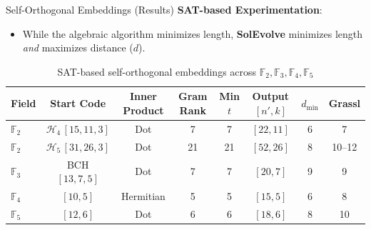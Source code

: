 \documentclass[10pt, aspectratio=169]{beamer}
\begin{document}
\begin{frame}{Self-Orthogonal Embeddings (Results)}
    \textbf{SAT-based Experimentation}:
    \begin{itemize}
        \item While the algebraic algorithm minimizes length, \textbf{SolEvolve} minimizes length \textit{and} maximizes distance ($d$).
    \end{itemize}

    \begin{table}[htbp]
    \centering \tiny
    \caption{SAT-based self-orthogonal embeddings across $\mathbb{F}_2,\mathbb{F}_3,\mathbb{F}_4,\mathbb{F}_5$}
    \begin{tabular}{lccccccc}
    \toprule
    Field & Start Code & Inner Product & Gram Rank & Min $t$ & Output $[n',k]$ & $d_{\min}$ & Grassl \\ \midrule
    $\mathbb{F}_2$ & $\mathcal{H}_4\,[15,11,3]$ & Dot & 7 & 7 & $[22,11]$ & 6 & 7 \\
    $\mathbb{F}_2$ & $\mathcal{H}_5\,[31,26,3]$ & Dot & 21 & 21 & $[52,26]$ & 8 & 10--12 \\
    $\mathbb{F}_3$ & BCH $[13,7,5]$ & Dot & 7 & 7 & $[20,7]$ & 9 & 9 \\
    $\mathbb{F}_4$ & $[10,5]$ & Hermitian & 5 & 5 & $[15,5]$ & 6 & 8 \\
    $\mathbb{F}_5$ & $[12,6]$ & Dot & 6 & 6 & $[18,6]$ & 8 & 10 \\
    \bottomrule
    \end{tabular}
    \end{table}
\end{frame}
\end{document}
